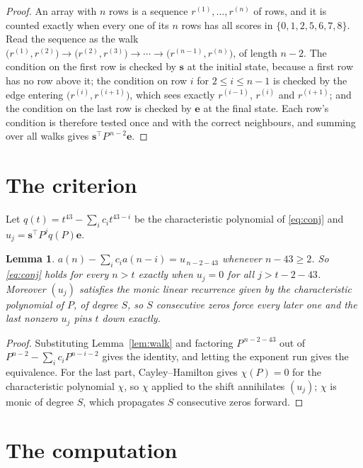 \documentclass[11pt,a4paper]{article}
\theoremstyle{plain}
\newtheorem{lemma}[theorem]{Lemma}
\theoremstyle{definition}
\begin{document}
\begin{proof}
An array with $n$ rows is a sequence $r^{(1)},\dots,r^{(n)}$ of rows, and it is counted
exactly when every one of its $n$ rows has all scores in $\{0,1,2,5,6,7,8\}$. Read the sequence as the
walk $\bigl(r^{(1)},r^{(2)}\bigr)\to\bigl(r^{(2)},r^{(3)}\bigr)\to\cdots\to
\bigl(r^{(n-1)},r^{(n)}\bigr)$, of length $n-2$. The condition on the first row is
checked by $\mathbf{s}$ at the initial state, because a first row has no row above it; the
condition on row $i$ for $2\le i\le n-1$ is checked by the edge entering
$\bigl(r^{(i)},r^{(i+1)}\bigr)$, which sees exactly $r^{(i-1)}$, $r^{(i)}$ and
$r^{(i+1)}$; and the condition on the last row is checked by $\mathbf{e}$ at the final
state. Each row's condition is therefore tested once and with the correct neighbours, and
summing over all walks gives $\mathbf{s}^{\!\top}P^{\,n-2}\mathbf{e}$.
\end{proof}

\section{The criterion}

Let $q(t)=t^{43}-\sum_i c_i t^{43-i}$ be the characteristic polynomial of
\eqref{eq:conj} and $u_j=\mathbf{s}^{\!\top}P^{j}q(P)\mathbf{e}$.

\begin{lemma}\label{lem:crit}
$a(n)-\sum_i c_i a(n-i)=u_{\,n-2-43}$ whenever $n-43\ge2$. So \eqref{eq:conj}
holds for every $n>t$ exactly when $u_j=0$ for all $j>t-2-43$. Moreover $(u_j)$
satisfies the monic linear recurrence given by the characteristic polynomial of $P$, of
degree $S$, so $S$ consecutive zeros force every later one and the last nonzero $u_j$ pins
$t$ down exactly.
\end{lemma}

\begin{proof}
Substituting Lemma~\ref{lem:walk} and factoring $P^{\,n-2-43}$ out of
$P^{n-2}-\sum_i c_i P^{n-i-2}$ gives the identity, and letting the exponent run gives the
equivalence. For the last part, Cayley--Hamilton gives $\chi(P)=0$ for the characteristic
polynomial $\chi$, so $\chi$ applied to the shift annihilates $(u_j)$; $\chi$ is monic of
degree $S$, which propagates $S$ consecutive zeros forward.
\end{proof}

\section{The computation}
\end{document}
